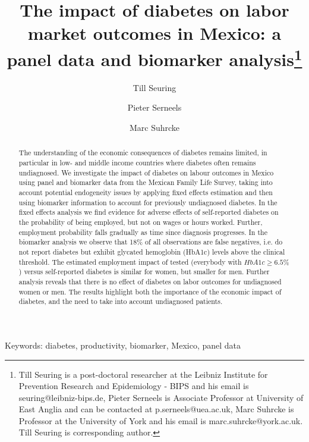 \documentclass[12pt,english]{article}
\begin{document}
\title{The impact of diabetes on labor market outcomes in Mexico: a panel data and biomarker analysis\thanks{Till Seuring is a post-doctoral researcher at the Leibniz Institute for Prevention Research and Epidemiology - BIPS and his email is seuring@leibniz-bips.de,  Pieter Serneels is Associate Professor at University of East Anglia and can be contacted at p.serneels@uea.ac.uk, Marc Suhrcke is Professor at the University of York and his email is marc.suhrcke@york.ac.uk. Till Seuring is corresponding author.}}

\author[1,2]{Till Seuring}
\author[2]{Pieter Serneels}
\author[3]{Marc Suhrcke}






\maketitle 
\begin{abstract}
The understanding of the economic consequences of diabetes remains limited, in particular in low- and middle income countries where diabetes often remains undiagnosed. We investigate the impact of diabetes on labour outcomes in Mexico using panel and biomarker data from the Mexican Family Life Survey, taking into account potential endogeneity issues by applying fixed effects estimation and then using biomarker information to account for previously undiagnosed diabetes. In the fixed effects analysis we find evidence for adverse effects of self-reported diabetes on the probability of being employed, but not on wages or hours worked. Further, employment probability falls gradually as time since diagnosis progresses. In the biomarker analysis we observe that 18\% of all observations are false negatives, i.e.
do not report diabetes but exhibit glycated hemoglobin (HbA1c) levels above the clinical threshold. The estimated employment impact of tested (everybody with $HbA1c \geq 6.5\%$) versus self-reported diabetes is similar for women, but smaller for men. Further analysis reveals that there is no effect of diabetes on labor outcomes for undiagnosed women or men. The results highlight both the importance of the economic impact of diabetes, and the need to take into account undiagnosed patients.
\end{abstract}

Keywords: diabetes, productivity, biomarker, Mexico, panel data
\end{document}
